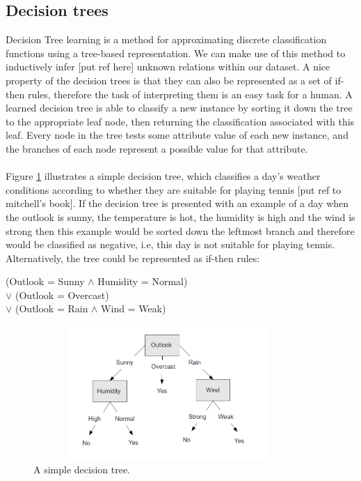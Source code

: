 \subsection{Decision trees}
Decision Tree learning is a method for approximating discrete classification functions using a tree-based representation. We can make use of this method to inductively infer [put ref here] unknown relations within our dataset. A nice property of the decision trees is that they can also be represented as a set of if-then rules, therefore the task of interpreting them is an easy task for a human. A learned decision tree is able to classify a new instance by sorting it down the tree to the appropriate leaf node, then returning the classification associated with this leaf. Every node in the tree tests some attribute value of each new instance, and the branches of each node represent a possible value for that attribute.\\\\
Figure \ref{DecisionTreeExample} illustrates a simple decision tree, which classifies a day's weather conditions according to whether they are suitable for playing tennis [put ref to mitchell's book]. If the decision tree is presented with an example of a day when the outlook is sunny, the temperature is hot, the humidity is high and the wind is strong then this example would be sorted down the leftmost branch and therefore would be classified as negative, i.e, this day is not suitable for playing tennis. Alternatively, the tree could be represented as if-then rules:\\  


\begin{center}
  (Outlook = Sunny $\wedge$ Humidity = Normal)\\
  $\vee$ (Outlook = Overcast)\\
  $\vee$ (Outlook = Rain $\wedge$ Wind = Weak)
\end{center}

\begin{figure}[!htbp]
  \begin{center}
    \includegraphics[height=2in, width=4in]{decision-tree-example}
    \caption{A simple decision tree.}
    \label{DecisionTreeExample}
  \end{center}
\end{figure} 

